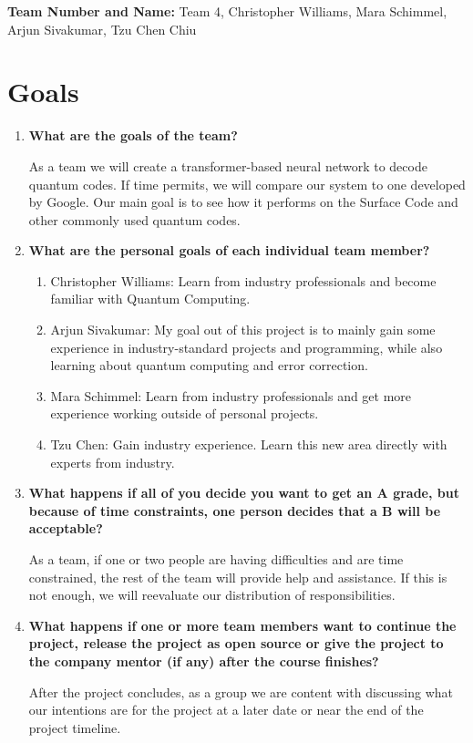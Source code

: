 \documentclass[12pt]{article}
\begin{document}
\maketitlepage

\noindent\textbf{Team Number and Name:} Team 4, Christopher Williams, Mara Schimmel, Arjun Sivakumar, Tzu Chen Chiu

\section{Goals}

\begin{enumerate}
    \item \textbf{What are the goals of the team?}

    As a team we will create a transformer-based neural network to decode quantum codes. If time permits, we will compare our system to one developed by Google. Our main goal is to see how it performs on the Surface Code and other commonly used quantum codes.

    \item \textbf{What are the personal goals of each individual team member?}
    \begin{enumerate}
        \item Christopher Williams: Learn from industry professionals and become familiar with Quantum Computing.
        \item Arjun Sivakumar: My goal out of this project is to mainly gain some experience in industry-standard projects and programming, while also learning about quantum computing and error correction.
        \item Mara Schimmel: Learn from industry professionals and get more experience working outside of personal projects.
        \item Tzu Chen: Gain industry experience. Learn this new area directly with experts from industry.
    \end{enumerate}

    \item \textbf{What happens if all of you decide you want to get an A grade, but because of time constraints, one person decides that a B will be acceptable?}

    As a team, if one or two people are having difficulties and are time constrained, the rest of the team will provide help and assistance. If this is not enough, we will reevaluate our distribution of responsibilities.

    \item \textbf{What happens if one or more team members want to continue the project, release the project as open source or give the project to the company mentor (if any) after the course finishes?}

    After the project concludes, as a group we are content with discussing what our intentions are for the project at a later date or near the end of the project timeline.
\end{enumerate}
\end{document}

